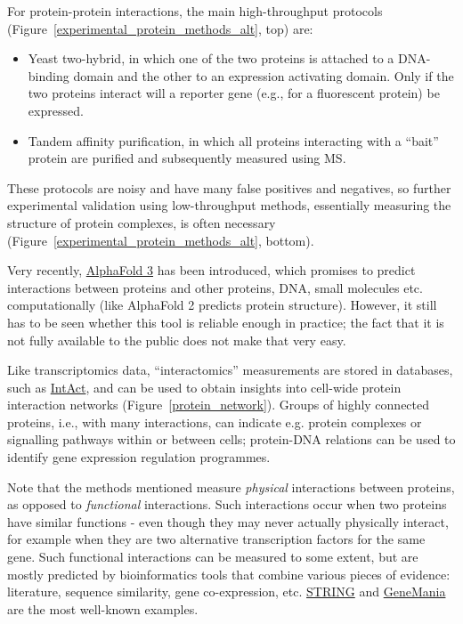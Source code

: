 \begin{framed}
For protein-protein interactions, the main high-throughput protocols
(Figure~\ref{experimental_protein_methods_alt}, top) are:

\begin{itemize}
\item Yeast two-hybrid, in which one of the two proteins is attached to a DNA-binding
domain and the other to an expression activating domain. Only if the two
proteins interact will a reporter gene (e.g., for a fluorescent protein) be
expressed.
\item Tandem affinity purification, in which all proteins interacting with a
``bait'' protein are purified and subsequently measured using MS.
\end{itemize}

These protocols are noisy and have many false positives and negatives, so
further experimental validation using low-throughput methods, essentially
measuring the structure of protein complexes, is often necessary
(Figure~\ref{experimental_protein_methods_alt}, bottom).

Very recently, \href{https://www.nature.com/articles/s41586-024-07487-w}{AlphaFold 3} has been introduced, which promises to predict
interactions between proteins and other proteins, DNA, small molecules etc.
computationally (like AlphaFold 2 predicts protein structure). However, it
still has to be seen whether this tool is reliable enough in practice; the
fact that it is not fully available to the public does not make that very
easy.
\end{framed}

Like transcriptomics data, ``interactomics'' measurements are stored in
databases, such as \href{https://www.ebi.ac.uk/intact/home}{IntAct}, and can be
used to obtain insights into cell-wide protein interaction networks
(Figure~\ref{protein_network}).  Groups of highly connected proteins, i.e.,
with many interactions, can indicate e.g. protein complexes or signalling
pathways within or between cells; protein-DNA relations can be used to
identify gene expression regulation programmes.

Note that the methods mentioned measure \textit{physical} interactions between
proteins, as opposed to \textit{functional} interactions.  Such interactions occur
when two proteins have similar functions - even though they may never
actually physically interact, for example when they are two alternative
transcription factors for the same gene.  Such functional interactions can
be measured to some extent, but are mostly predicted by bioinformatics tools
that combine various pieces of evidence: literature, sequence similarity,
gene co-expression, etc.  \href{https://string-db.org/}{STRING} and
\href{https://genemania.org/}{GeneMania} are the most well-known examples.


